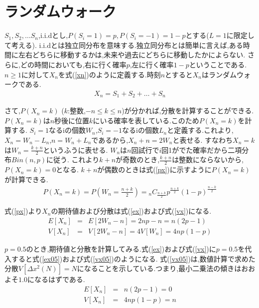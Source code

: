 \documentclass[a4j]{jarticle}
\begin{document}
    \section{ランダムウォーク}
    $S_1,S_2,\dots S_n$,i.i.dとし,$P(S_i=1)=p,P(S_i=-1)=1-p$とする($L=1$に限定して考える). i.i.dとは独立同分布を意味する.独立同分布とは簡単に言えば,ある時間に左右どちらに移動するかは,未来や過去にどちらに移動したかによらない.
    さらに,どの時間においても,右に行く確率$p$,左に行く確率$1-p$ということである.$n \geq 1$に対して$X_n$を式(\ref{xn})のように定義する.時刻$n$とすると$X_n$はランダムウォークである.
  \begin{eqnarray}
    X_n = S_1 + S_2 + \dots + S_n \label{xn}
  \end{eqnarray}

  さて,$P(X_n=k)$ ($k$:整数,$-n \leq k \leq n$)が分かれば,分散を計算することができる. $P(X_n=k)$は$n$秒後に位置$k$にいる確率を表している.このため$P(X_n=k)$を計算する.
  $S_i=1$なるiの個数$W_n$,$S_i=-1$なるiの個数$L_n$と定義する.これより,$X_n=W_n-L_n$,$n=W_n+L_n$であるから,$X_n+n=2W_n$と表せる.
  すなわち$X_n=k$は$W_n=\frac{k+n}{2}$というふうに表せる.
  $W_n$は$n$回試行で$i$回1がでた確率だから二項分布$Bin(n,p)$に従う. これより$k+n$が奇数のとき,$\frac{k+n}{2}$は整数にならないから,$P(X_n =k)=0$となる.
  $k+n$が偶数のときは式(\ref{px})に示すように$P(X_n=k)$が計算できる.
  \begin{eqnarray}
    P(X_n=k) = P\left( W_n = \frac{n+k}{2} \right) = {}_n C _{\frac{n+k}{2}} p^{\frac{n+k}{2}} (1-p)^{\frac{n-k}{2}} \label{px}
  \end{eqnarray}

  式(\ref{px})より$X_n$の期待値および分散は式(\ref{ex})および式(\ref{vx})になる.
  \begin{eqnarray}
    E[X_n] &=& E[2W_n -n] = 2np-n = n(2p-1) \label{ex} \\
    V[X_n] &=& V[2W_n -n] = 4V[W_n] = 4np(1-p) \label{vx}
  \end{eqnarray}

  $p=0.5$のとき,期待値と分散を計算してみる.式(\ref{ex})および式(\ref{vx})に$p=0.5$を代入すると式(\ref{ex05})および式(\ref{vx05})のようになる.
  式(\ref{vx05})は,数値計算で求めた分散$V[\Delta x^2(N)]=N$になることを示している.つまり,最小二乗法の傾きはおおよそ$1.0$になるはずである.
  \begin{eqnarray}
    E[X_n] &=&  n(2p-1) = 0 \label{ex05} \\
    V[X_n] &=& 4np(1-p) = n \label{vx05}
  \end{eqnarray}
\end{document}
